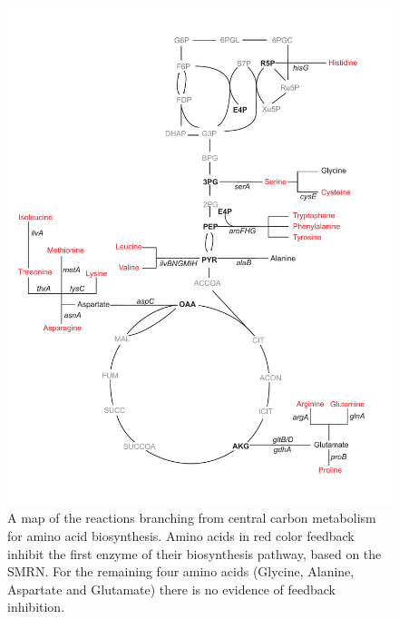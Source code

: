 \documentclass[12pt,a4paper]{article}
\begin{document}
\begin{figure}[ht!]
	\includegraphics[width=\textwidth]{../manuscript/figS7.pdf}
	\caption{A map of the reactions branching from central carbon metabolism for amino acid biosynthesis. Amino acids in red color feedback inhibit the first enzyme of their biosynthesis pathway, based on the SMRN. For the remaining four amino acids (Glycine, Alanine, Aspartate and Glutamate) there is no evidence of feedback inhibition.}
\end{figure}
\end{document}
